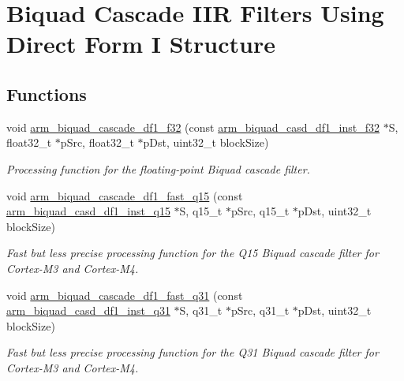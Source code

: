 \hypertarget{group___biquad_cascade_d_f1}{\section{Biquad Cascade I\-I\-R Filters Using Direct Form I Structure}
\label{group___biquad_cascade_d_f1}
}
\subsection*{Functions}
\begin{DoxyCompactItemize}
\item 
void \hyperlink{group___biquad_cascade_d_f1_gaa0dbe330d763e3c1d8030b3ef12d5bdc}{arm\-\_\-biquad\-\_\-cascade\-\_\-df1\-\_\-f32} (const \hyperlink{structarm__biquad__casd__df1__inst__f32}{arm\-\_\-biquad\-\_\-casd\-\_\-df1\-\_\-inst\-\_\-f32} $\ast$S, float32\-\_\-t $\ast$p\-Src, float32\-\_\-t $\ast$p\-Dst, uint32\-\_\-t block\-Size)
\begin{DoxyCompactList}\small\item\em Processing function for the floating-\/point Biquad cascade filter. \end{DoxyCompactList}\item 
void \hyperlink{group___biquad_cascade_d_f1_gaffb9792c0220882efd4c58f3c6a05fd7}{arm\-\_\-biquad\-\_\-cascade\-\_\-df1\-\_\-fast\-\_\-q15} (const \hyperlink{structarm__biquad__casd__df1__inst__q15}{arm\-\_\-biquad\-\_\-casd\-\_\-df1\-\_\-inst\-\_\-q15} $\ast$S, q15\-\_\-t $\ast$p\-Src, q15\-\_\-t $\ast$p\-Dst, uint32\-\_\-t block\-Size)
\begin{DoxyCompactList}\small\item\em Fast but less precise processing function for the Q15 Biquad cascade filter for Cortex-\/\-M3 and Cortex-\/\-M4. \end{DoxyCompactList}\item 
void \hyperlink{group___biquad_cascade_d_f1_ga456390f5e448afad3a38bed7d6e380e3}{arm\-\_\-biquad\-\_\-cascade\-\_\-df1\-\_\-fast\-\_\-q31} (const \hyperlink{structarm__biquad__casd__df1__inst__q31}{arm\-\_\-biquad\-\_\-casd\-\_\-df1\-\_\-inst\-\_\-q31} $\ast$S, q31\-\_\-t $\ast$p\-Src, q31\-\_\-t $\ast$p\-Dst, uint32\-\_\-t block\-Size)
\begin{DoxyCompactList}\small\item\em Fast but less precise processing function for the Q31 Biquad cascade filter for Cortex-\/\-M3 and Cortex-\/\-M4. \end{DoxyCompactList}\item 

\end{DoxyCompactItemize}
